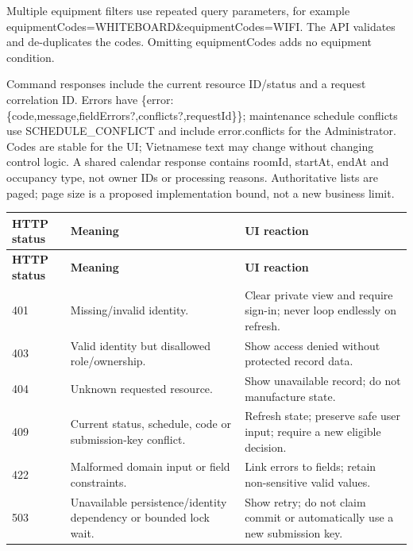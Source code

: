 \vspace{2mm}

Multiple equipment filters use repeated query parameters, for example equipmentCodes=WHITEBOARD\allowbreak{}\&\allowbreak{}equipmentCodes=WIFI. The API validates and de-duplicates the codes. Omitting equipmentCodes adds no equipment condition.\par

Command responses include the current resource ID/status and a request correlation ID. Errors have \{error:\{code,message,fieldErrors?,conflicts?,requestId\}\}; maintenance schedule conflicts use SCHEDULE\_CONFLICT and include error.conflicts for the Administrator. Codes are stable for the UI; Vietnamese text may change without changing control logic. A shared calendar response contains roomId, startAt, endAt and occupancy type, not owner IDs or processing reasons. Authoritative lists are paged; page size is a proposed implementation bound, not a new business limit.\par

\begin{longtable}{|p{}|p{}|p{}|}

\hline

\textbf{HTTP status} & \textbf{Meaning} & \textbf{UI reaction} \\ \hline

\endfirsthead

\hline

\textbf{HTTP status} & \textbf{Meaning} & \textbf{UI reaction} \\ \hline

\endhead

401 & Missing/\allowbreak{}invalid identity.\allowbreak{} & Clear private view and require sign-\allowbreak{}in; never loop endlessly on refresh.\allowbreak{} \\ \hline

403 & Valid identity but disallowed role/\allowbreak{}ownership.\allowbreak{} & Show access denied without protected record data.\allowbreak{} \\ \hline

404 & Unknown requested resource.\allowbreak{} & Show unavailable record; do not manufacture state.\allowbreak{} \\ \hline

409 & Current status, schedule, code or submission-\allowbreak{}key conflict.\allowbreak{} & Refresh state; preserve safe user input; require a new eligible decision.\allowbreak{} \\ \hline

422 & Malformed domain input or field constraints.\allowbreak{} & Link errors to fields; retain non-\allowbreak{}sensitive valid values.\allowbreak{} \\ \hline

503 & Unavailable persistence/\allowbreak{}identity dependency or bounded lock wait.\allowbreak{} & Show retry; do not claim commit or automatically use a new submission key.\allowbreak{} \\ \hline

\end{longtable}

